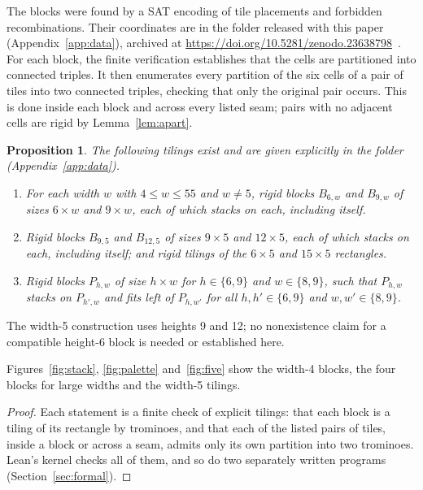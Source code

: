 \documentclass[11pt]{article}
\newtheorem{proposition}[theorem]{Proposition}
\theoremstyle{definition}
\theoremstyle{remark}
\newcommand{\file}[1]{\texttt{\detokenize{#1}}}
\begin{document}
The blocks were found by a SAT encoding of tile placements and forbidden
recombinations. Their coordinates are in the \file{data/} folder released
with this paper (Appendix~\ref{app:data}), archived at
\url{https://doi.org/10.5281/zenodo.23638798}~\cite{GrahamArchive}.
For each block, the finite verification establishes
that the cells are partitioned into connected triples. It then enumerates
every partition of the six cells of a pair of tiles into two connected
triples, checking that only the original pair occurs. This is done inside
each block and across every listed seam; pairs with no adjacent cells are
rigid by Lemma~\ref{lem:apart}.

\begin{proposition}\label{prop:blocks}
The following tilings exist and are given explicitly in the \file{data/}
folder (Appendix~\ref{app:data}).
\begin{enumerate}
\item[(i)] For each width $w$ with $4\le w\le55$ and $w\ne5$, rigid blocks
$B_{6,w}$ and $B_{9,w}$ of sizes $6\times w$ and $9\times w$, each of which
stacks on each, including itself.
\item[(ii)] Rigid blocks $B_{9,5}$ and $B_{12,5}$ of sizes $9\times5$ and
$12\times5$, each of which stacks on each, including itself; and rigid
tilings of the $6\times5$ and $15\times5$ rectangles.
\item[(iii)] Rigid blocks $P_{h,w}$ of size $h\times w$ for $h\in\{6,9\}$
and $w\in\{8,9\}$, such that $P_{h,w}$ stacks on $P_{h',w}$ and fits left of
$P_{h,w'}$ for all $h,h'\in\{6,9\}$ and $w,w'\in\{8,9\}$.
\end{enumerate}
\end{proposition}

The width-5 construction uses heights 9 and 12; no nonexistence claim for
a compatible height-6 block is needed or established here.

Figures~\ref{fig:stack}, \ref{fig:palette} and~\ref{fig:five} show the
width-4 blocks, the four blocks for large widths and the width-5 tilings.
\begin{proof}
Each statement is a finite check of explicit tilings: that each block is a
tiling of its rectangle by trominoes, and that each of the listed pairs of
tiles, inside a block or across a seam, admits only its own partition into
two trominoes. Lean's kernel checks all of them, and so do two separately
written programs (Section~\ref{sec:formal}).
\end{proof}
\end{document}
